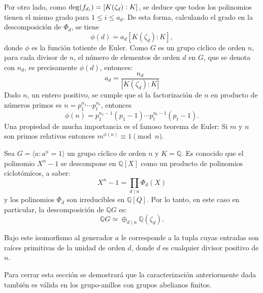 Por otro lado, como $\operatorname{deg}(f_{d_i}) = [K(\zeta_d):K]$, se deduce que todos los polinomios tienen el mismo grado para $1 \leq i \leq a_d$. De esta forma, calculando el grado en la descomposición de $\Phi_d$, se tiene
\[ \phi(d) = a_d[K(\zeta_d):K], \]
donde $\phi$ es la función totiente de Euler. Como $G$ es un grupo cíclico de orden $n$, para cada divisor de $n$, el número de elementos de orden $d$ en $G$, que se denota con $n_d$, es precisamente $\phi(d)$, entonces:
\[ a_d = \frac{n_d}{| K(\zeta_d) : K|}  \]
Dado $n$, un entero positivo, se cumple que si la factorización de $n$ en producto de números primos es $n = p_1^{n_1}\cdots p_t^{n_t}$, entonces \[ \phi(n) = p_1^{n_1-1}(p_1-1)\cdots p_t^{n_t-1}(p_t-1).  \] Una propiedad de mucha importancia es el famoso teorema de Euler: Si $m$ y $n$ son primos relativos entonces $m^{\phi(n)} \equiv 1 \pmod{n}.$
\begin{ejemplo}\label{ejem:descomposicionRacional}
Sea $G = \langle a: a^n = 1 \rangle$  un grupo cíclico de orden $n$ y $K = \mathds{Q} $. Es conocido que el polinomio $X^n-1$ se descompone en $\mathds{Q}[X]$ como un producto de polinomios ciclotómicos, a saber:
\[ X^n -1 = \prod_{d \mid n}\Phi_d(X)  \]
y los polinomios $\Phi_d$ son irreducibles en $\mathds{Q}[Q]$. Por lo tanto, en este caso en particular, la descomposición de $\mathds{Q}G$ es:
\[ \mathds{Q}G \simeq \oplus_{d\mid n} \mathds{Q}(\zeta_d).  \]

Bajo este isomorfismo al generador $a$ le corresponde a la tupla cuyas entradas son raíces primitivas de la unidad de orden $d$, donde $d$ es cualquier divisor positivo de $n$. 
\end{ejemplo}

Para cerrar esta sección se demostrará que la caracterización anteriormente dada  también es válida en los grupo-anillos con grupos  abelianos finitos.

